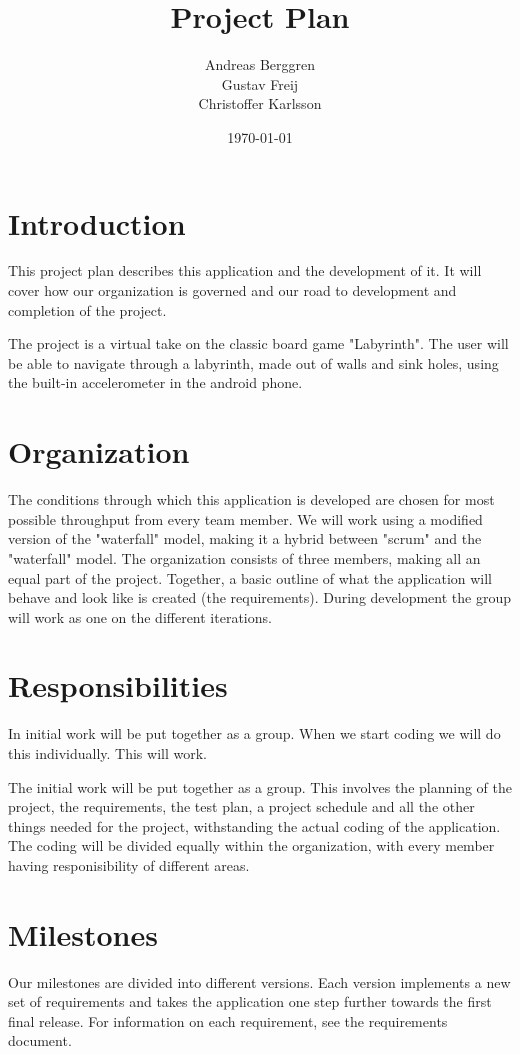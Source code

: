 \documentclass[a4paper,titlepage]{article}
\title{Project Plan}
\author{Andreas Berggren\\
        Gustav Freij\\
        Christoffer Karlsson}
\date{\today}
\begin{document}
\maketitle

\tableofcontents
\newpage

% 
\setcounter{page}{1}

\section{Introduction}
This project plan describes this application and the development of it. It will
cover how our organization is governed and our road to development and completion
of the project.

The project is a virtual take on the classic board game "Labyrinth".
The user will be able to navigate through a labyrinth, made out of walls and
sink holes, using the built-in accelerometer in the android phone.
\section{Organization}
The conditions through which this application is developed are chosen for most
possible throughput from every team member. We will work using a modified version
of the "waterfall" model, making it a hybrid between "scrum" and the "waterfall"
model. The organization consists of three members, making all an equal part
of the project. Together, a basic outline of what the application will behave and
look like is created (the requirements). During development the group will work
as one on the different iterations.
\section{Responsibilities}
In initial work will be put together as a group. When we start coding we will do
this individually. This will work.

The initial work will be put together as a group. This involves the planning of
the project, the requirements, the test plan, a project schedule and all the other
things needed for the project, withstanding the actual coding of the application.
The coding will be divided equally within the organization, with every member
having responisibility of different areas.
\newpage
\section{Milestones}
Our milestones are divided into different versions. Each version implements a new
set of requirements and takes the application one step further towards the first
final release. For information on each requirement, see the requirements document.
\end{document}
